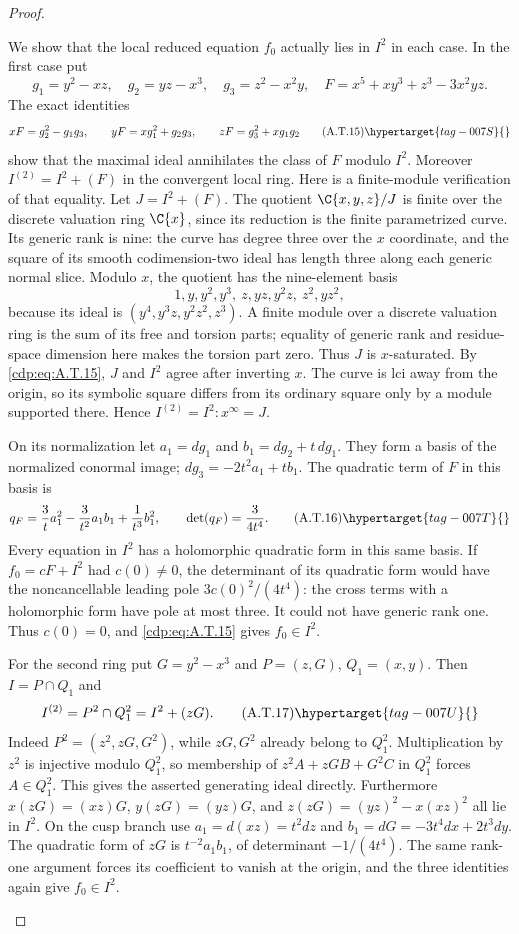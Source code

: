\begin{proof}
\begin{enumerate}[label={$\langle1\rangle$\arabic*.},leftmargin=*]
We show that the local reduced equation $f_0$ actually
lies in $I^2$ in each case. In the first case put
\[
 g_1=y^2-xz,\quad g_2=yz-x^3,\quad
 g_3=z^2-x^2y,\quad
 F=x^5+xy^3+z^3-3x^2yz.
\]
The exact identities
\[
 xF=g_2^2-g_1g_3,\qquad
 yF=xg_1^2+g_2g_3,\qquad
 zF=g_3^2+xg_1g_2                              \tag{A.T.15}\hypertarget{tag-007S}{}\label{cdp:eq:A.T.15}
\]
show that the maximal ideal annihilates the class of
$F$ modulo $I^2$. Moreover
$I^{(2)}=I^2+(F)$ in the convergent local ring.
Here is a finite-module verification of that equality.
Let $J=I^2+(F)$. The quotient $\C\{x,y,z\}/J$ is
finite over the discrete valuation ring $\C\{x\}$,
since its reduction is the finite parametrized curve.
Its generic rank is nine: the curve has degree three
over the $x$ coordinate, and the square of its smooth
codimension-two ideal has length three along each
generic normal slice. Modulo $x$, the quotient has
the nine-element basis
\[
 1,y,y^2,y^3,\ z,yz,y^2z,\ z^2,yz^2,
\]
because its ideal is $(y^4,y^3z,y^2z^2,z^3)$.
A finite module over a discrete valuation ring is
the sum of its free and torsion parts; equality of
generic rank and residue-space dimension here makes
the torsion part zero. Thus $J$ is $x$-saturated.
By \eqref{cdp:eq:A.T.15}, $J$ and $I^2$ agree after inverting $x$.
The curve is lci away from the origin, so its symbolic
square differs from its ordinary square only by a
module supported there. Hence
$I^{(2)}=I^2:x^\infty=J$.

On its normalization let
$a_1=dg_1$ and $b_1=dg_2+t\,dg_1$.
They form a basis of the normalized conormal image;
$dg_3=-2t^2a_1+t b_1$.
The quadratic term of $F$ in this basis is
\[
 q_F=\frac3t a_1^2-\frac3{t^2}a_1b_1
                           +\frac1{t^3}b_1^2,
 \qquad \det(q_F)=\frac3{4t^4}.                  \tag{A.T.16}\hypertarget{tag-007T}{}\label{cdp:eq:A.T.16}
\]
Every equation in $I^2$ has a holomorphic quadratic
form in this same basis. If $f_0=cF+I^2$ had
$c(0)\ne0$, the determinant of its quadratic form
would have the noncancellable leading pole
$3c(0)^2/(4t^4)$: the cross terms with a holomorphic
form have pole at most three. It could not have
generic rank one. Thus $c(0)=0$, and \eqref{cdp:eq:A.T.15} gives
$f_0\in I^2$.

For the second ring put $G=y^2-x^3$ and
$P=(z,G)$, $Q_1=(x,y)$. Then $I=P\cap Q_1$ and
\[
 I^{(2)}=P^2\cap Q_1^2=I^2+(zG).                \tag{A.T.17}\hypertarget{tag-007U}{}\label{cdp:eq:A.T.17}
\]
Indeed $P^2=(z^2,zG,G^2)$, while $zG,G^2$ already
belong to $Q_1^2$. Multiplication by $z^2$ is
injective modulo $Q_1^2$, so membership of
$z^2A+zGB+G^2C$ in $Q_1^2$ forces $A\in Q_1^2$.
This gives the asserted generating ideal directly.
Furthermore
$x(zG)=(xz)G$, $y(zG)=(yz)G$, and
$z(zG)=(yz)^2-x(xz)^2$ all lie in $I^2$.
On the cusp branch use $a_1=d(xz)=t^2dz$ and
$b_1=dG=-3t^4dx+2t^3dy$.
The quadratic form of $zG$ is $t^{-2}a_1b_1$,
of determinant $-1/(4t^4)$. The same rank-one
argument forces its coefficient to vanish at the
origin, and the three identities again give
$f_0\in I^2$.


\end{enumerate}
\end{proof}
